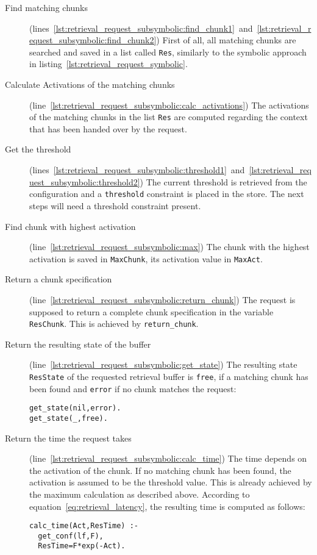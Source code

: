 \begin{description}
 \item[Find matching chunks] (lines~\ref{lst:retrieval_request_subsymbolic:find_chunk1}~and~\ref{lst:retrieval_request_subsymbolic:find_chunk2}) First of all, all matching chunks are searched and saved in a list called \lstinline|Res|, similarly to the symbolic approach in listing~\ref{lst:retrieval_request_symbolic}.
 \item[Calculate Activations of the matching chunks] (line~\ref{lst:retrieval_request_subsymbolic:calc_activations}) The activations of the matching chunks in the list \lstinline|Res| are computed regarding the context that has been handed over by the request.
 \item[Get the threshold] (lines~\ref{lst:retrieval_request_subsymbolic:threshold1}~and~\ref{lst:retrieval_request_subsymbolic:threshold2}) The current threshold is retrieved from the configuration and a \lstinline|threshold| constraint is placed in the store. The next steps will need a threshold constraint present.
 \item[Find chunk with highest activation] (line~\ref{lst:retrieval_request_subsymbolic:max}) The chunk with the highest activation is saved in \lstinline|MaxChunk|, its activation value in \lstinline|MaxAct|.
 \item[Return a chunk specification] (line~\ref{lst:retrieval_request_subsymbolic:return_chunk}) The request is supposed to return a complete chunk specification in the variable \lstinline|ResChunk|. This is achieved by \lstinline|return_chunk|.
 \item[Return the resulting state of the buffer] (line~\ref{lst:retrieval_request_subsymbolic:get_state}) The resulting state \lstinline|ResState| of the requested retrieval buffer is \lstinline|free|, if a matching chunk has been found and \lstinline|error| if no chunk matches the request:
 
\begin{lstlisting}
get_state(nil,error).
get_state(_,free).
\end{lstlisting}

 \item[Return the time the request takes] (line~\ref{lst:retrieval_request_subsymbolic:calc_time}) The time depends on the activation of the chunk. If no matching chunk has been found, the activation is assumed to be the threshold value. This is already achieved by the maximum calculation as described above. According to equation~\eqref{eq:retrieval_latency}, the resulting time is computed as follows:
 
\begin{lstlisting}
calc_time(Act,ResTime) :-
  get_conf(lf,F),
  ResTime=F*exp(-Act). 
\end{lstlisting}
\end{description}

